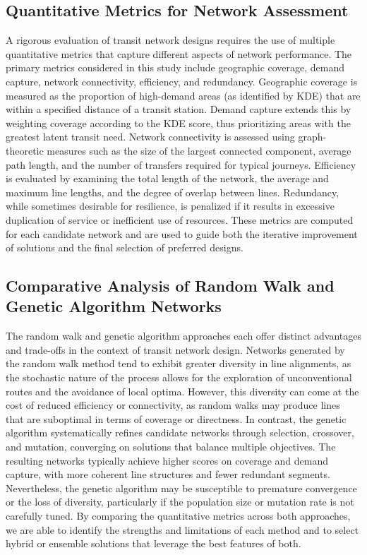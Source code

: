\documentclass[manuscript,screen,review]{acmart}
\begin{document}
\subsection{Quantitative Metrics for Network Assessment}
A rigorous evaluation of transit network designs requires the use of multiple quantitative metrics that capture different aspects of network performance. The primary metrics considered in this study include geographic coverage, demand capture, network connectivity, efficiency, and redundancy. Geographic coverage is measured as the proportion of high-demand areas (as identified by KDE) that are within a specified distance of a transit station. Demand capture extends this by weighting coverage according to the KDE score, thus prioritizing areas with the greatest latent transit need. Network connectivity is assessed using graph-theoretic measures such as the size of the largest connected component, average path length, and the number of transfers required for typical journeys. Efficiency is evaluated by examining the total length of the network, the average and maximum line lengths, and the degree of overlap between lines. Redundancy, while sometimes desirable for resilience, is penalized if it results in excessive duplication of service or inefficient use of resources. These metrics are computed for each candidate network and are used to guide both the iterative improvement of solutions and the final selection of preferred designs.

\subsection{Comparative Analysis of Random Walk and Genetic Algorithm Networks}
The random walk and genetic algorithm approaches each offer distinct advantages and trade-offs in the context of transit network design. Networks generated by the random walk method tend to exhibit greater diversity in line alignments, as the stochastic nature of the process allows for the exploration of unconventional routes and the avoidance of local optima. However, this diversity can come at the cost of reduced efficiency or connectivity, as random walks may produce lines that are suboptimal in terms of coverage or directness. In contrast, the genetic algorithm systematically refines candidate networks through selection, crossover, and mutation, converging on solutions that balance multiple objectives. The resulting networks typically achieve higher scores on coverage and demand capture, with more coherent line structures and fewer redundant segments. Nevertheless, the genetic algorithm may be susceptible to premature convergence or the loss of diversity, particularly if the population size or mutation rate is not carefully tuned. By comparing the quantitative metrics across both approaches, we are able to identify the strengths and limitations of each method and to select hybrid or ensemble solutions that leverage the best features of both.
\end{document}
